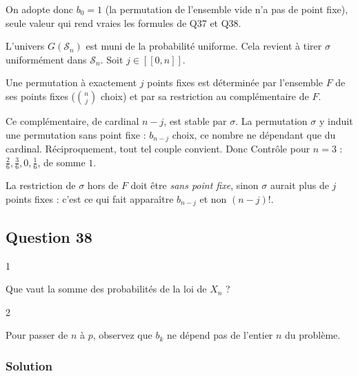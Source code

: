 \documentclass[11pt,a4paper]{article}
\newcommand{\equationajustee}[1]{%
  \sbox{\boiteequation}{$\displaystyle #1$}%
  \ifdim\wd\boiteequation>\linewidth
    \[\resizebox{\linewidth}{!}{\usebox{\boiteequation}}\]%
  \else
    \[#1\]%
  \fi}
\begin{document}
On adopte donc \(\boxed{b_0=1}\) (la permutation de l'ensemble vide n'a pas de point fixe), seule valeur qui rend vraies les formules de Q37 et Q38.

L'univers \(G(\mathcal S_n)\) est muni de la probabilité uniforme. Cela revient à tirer \(\sigma\) uniformément dans \(\mathcal S_n\). Soit \(j\in[\![0,n]\!]\).

Une permutation à exactement \(j\) points fixes est déterminée par l'ensemble \(F\) de ses points fixes (\(\binom nj\) choix) et par sa restriction au complémentaire de \(F\).

Ce complémentaire, de cardinal \(n-j\), est stable par \(\sigma\). La permutation \(\sigma\) y induit une permutation sans point fixe : \(b_{n-j}\) choix, ce nombre ne dépendant que du cardinal. Réciproquement, tout tel couple convient. Donc
\equationajustee{\boxed{\forall j\in[\![0,n]\!],\ \ P(X_n=j)=\frac{\binom nj\,b_{n-j}}{n!}.}}
Contrôle pour \(n=3\) : \(\frac26,\frac36,0,\frac16\), de somme \(1\).

\begin{piege}

La restriction de \(\sigma\) hors de \(F\) doit être \emph{sans point fixe}, sinon \(\sigma\) aurait plus de \(j\) points fixes : c'est ce qui fait apparaître \(b_{n-j}\) et non \((n-j)!\).

\end{piege}

\hypertarget{question-38}{%
\subsection{Question 38}\label{question-38}}

\begin{indication}{1}

Que vaut la somme des probabilités de la loi de \(X_n\) ?

\end{indication}

\begin{indication}{2}

Pour passer de \(n\) à \(p\), observez que \(b_k\) ne dépend pas de l'entier \(n\) du problème.

\end{indication}

\hypertarget{solution-37}{%
\subsubsection{Solution}\label{solution-37}}
\end{document}

